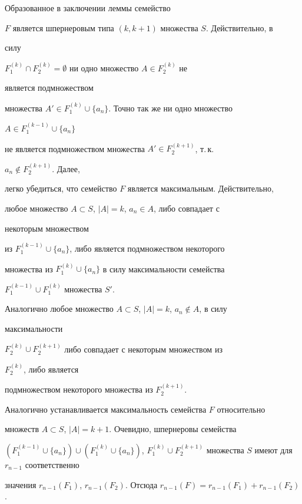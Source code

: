 


\begin{pf} 


Образованное в заключении леммы семейство 


$F$ является шпернеровым типа $(k,k+1)$ множества $S$. Действительно, в 


силу 


$F_1^{(k)}\cap F_2^{(k)}=\emptyset$ ни одно множество $A\in F_2^{(k)}$ не 


является подмножеством 


множества $A'\in F_1^{(k)}\cup\{a_n\}$. Точно так же ни одно множество 


$A\in F_1^{(k-1)}\cup\{a_n\}$ 


не является подмножеством множества $A'\in F_2^{(k+1)}$, т.\,к. 


$a_n\notin F_2^{(k+1)}$. Далее, 


легко убедиться, что семейство $F$ является максимальным. Действительно, 


любое множество $A\subset S$, $|A|=k$, $a_n\in A$, либо совпадает с 


некоторым множеством 


из $F_1^{(k-1)}\cup\{a_n\}$, либо является подмножеством некоторого 


множества из $F_1^{(k)}\cup\{a_n\}$ в силу максимальности семейства 


$F_1^{(k-1)}\cup F_1^{(k)}$ множества $S'$. 


Аналогично любое множество $A\subset S$, $|A|=k$, $a_n\notin A$, в силу 


максимальности 


$F_2^{(k)}\cup F_2^{(k+1)}$ либо совпадает с некоторым множеством из 


$F_2^{(k)}$, либо является 


подмножеством некоторого множества из $F_2^{(k+1)}$. 


Аналогично устанавливается максимальность семейства $F$ относительно 


множеств $A\subset S$, $|A|=k+1$. Очевидно, шпернеровы семейства 


$(F_1^{(k-1)}\cup\{a_n\})\cup (F_1^{(k)}\cup\{a_n\})$, $F_1^{(k)}\cup 


F_2^{(k+1)}$ множества $S$ имеют для $r_{n-1}$ соответственно 


значения $r_{n-1}(F_1)$, $r_{n-1}(F_2)$. Отсюда $r_{n-1}(F)=r_{n-1}(F_1)+ 


r_{n-1}(F_2)$. 


\end{pf} 


